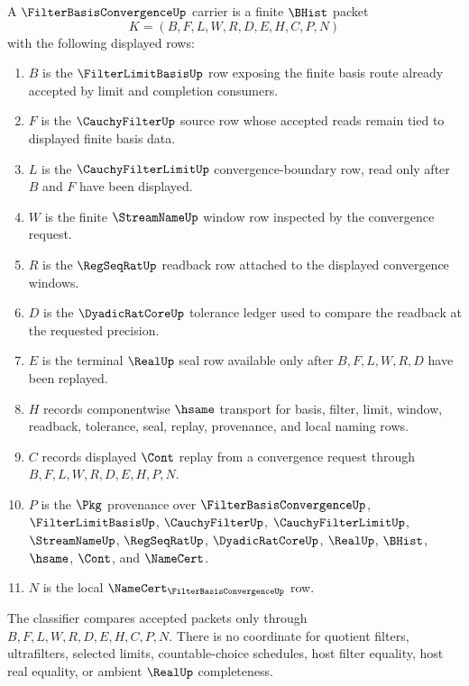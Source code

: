 \begin{definition}
\label{def:filter-basis-convergence-carrier}
A $\FilterBasisConvergenceUp$ carrier is a finite $\BHist$ packet
$$
K=(B,F,L,W,R,D,E,H,C,P,N)
$$
with the following displayed rows:
\begin{enumerate}
\item $B$ is the $\FilterLimitBasisUp$ row exposing the finite basis route already accepted by limit and completion consumers.
\item $F$ is the $\CauchyFilterUp$ source row whose accepted reads remain tied to displayed finite basis data.
\item $L$ is the $\CauchyFilterLimitUp$ convergence-boundary row, read only after $B$ and $F$ have been displayed.
\item $W$ is the finite $\StreamNameUp$ window row inspected by the convergence request.
\item $R$ is the $\RegSeqRatUp$ readback row attached to the displayed convergence windows.
\item $D$ is the $\DyadicRatCoreUp$ tolerance ledger used to compare the readback at the requested precision.
\item $E$ is the terminal $\RealUp$ seal row available only after $B,F,L,W,R,D$ have been replayed.
\item $H$ records componentwise $\hsame$ transport for basis, filter, limit, window, readback, tolerance, seal, replay, provenance, and local naming rows.
\item $C$ records displayed $\Cont$ replay from a convergence request through $B,F,L,W,R,D,E,H,P,N$.
\item $P$ is the $\Pkg$ provenance over $\FilterBasisConvergenceUp$, $\FilterLimitBasisUp$, $\CauchyFilterUp$, $\CauchyFilterLimitUp$, $\StreamNameUp$, $\RegSeqRatUp$, $\DyadicRatCoreUp$, $\RealUp$, $\BHist$, $\hsame$, $\Cont$, and $\NameCert$.
\item $N$ is the local $\NameCert_{\FilterBasisConvergenceUp}$ row.
\end{enumerate}
The classifier compares accepted packets only through $B,F,L,W,R,D,E,H,C,P,N$. There is no coordinate for quotient filters, ultrafilters, selected limits, countable-choice schedules, host filter equality, host real equality, or ambient $\RealUp$ completeness.
\end{definition}

